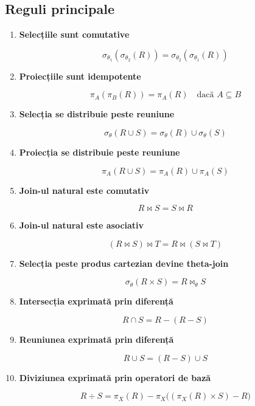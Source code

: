 \documentclass[12pt,a4paper]{article}
\begin{document}
\subsection*{Reguli principale}

\begin{enumerate}
    \item \textbf{Selecțiile sunt comutative}
    

\[
        \sigma_{\theta_1}(\sigma_{\theta_2}(R)) = 
        \sigma_{\theta_2}(\sigma_{\theta_1}(R))
    \]



    \item \textbf{Proiecțiile sunt idempotente}
    

\[
        \pi_A(\pi_B(R)) = \pi_A(R) \quad \text{dacă } A \subseteq B
    \]



    \item \textbf{Selecția se distribuie peste reuniune}
    

\[
        \sigma_{\theta}(R \cup S) = 
        \sigma_{\theta}(R) \cup \sigma_{\theta}(S)
    \]



    \item \textbf{Proiecția se distribuie peste reuniune}
    

\[
        \pi_A(R \cup S) = \pi_A(R) \cup \pi_A(S)
    \]



    \item \textbf{Join-ul natural este comutativ}
    

\[
        R \bowtie S = S \bowtie R
    \]



    \item \textbf{Join-ul natural este asociativ}
    

\[
        (R \bowtie S) \bowtie T = R \bowtie (S \bowtie T)
    \]



    \item \textbf{Selecția peste produs cartezian devine theta-join}
    

\[
        \sigma_{\theta}(R \times S) = R \bowtie_{\theta} S
    \]



    \item \textbf{Intersecția exprimată prin diferență}
    

\[
        R \cap S = R - (R - S)
    \]



    \item \textbf{Reuniunea exprimată prin diferență}
    

\[
        R \cup S = (R - S) \cup S
    \]



    \item \textbf{Diviziunea exprimată prin operatori de bază}
    

\[
        R \div S = \pi_X(R) - 
        \pi_X\big((\pi_X(R) \times S) - R\big)
    \]


\end{enumerate}
\end{document}
